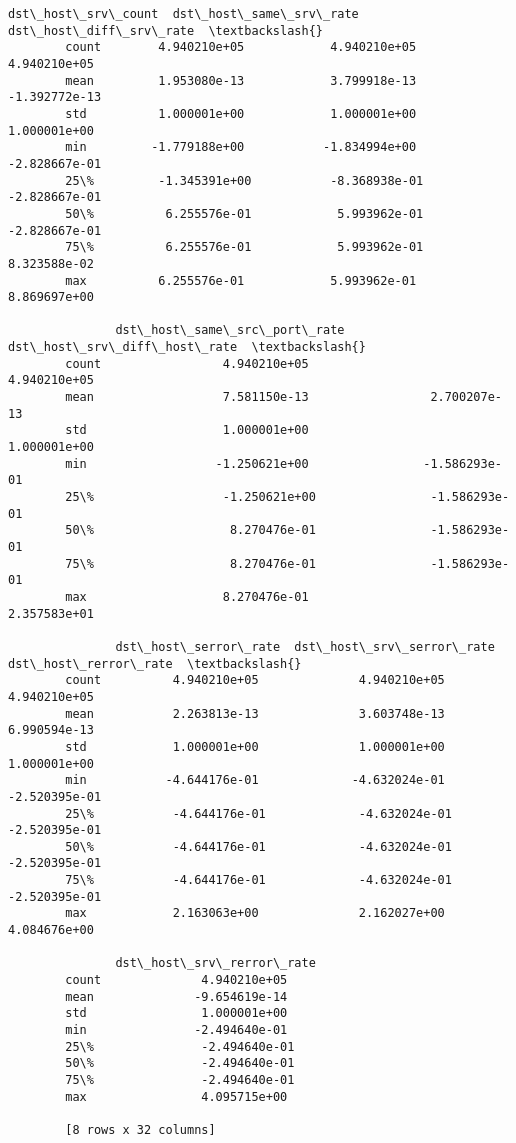 \documentclass[11pt]{article}
\begin{document}
\begin{Verbatim}[commandchars=\\\{\}]
               dst\_host\_srv\_count  dst\_host\_same\_srv\_rate  dst\_host\_diff\_srv\_rate  \textbackslash{}
        count        4.940210e+05            4.940210e+05            4.940210e+05   
        mean         1.953080e-13            3.799918e-13           -1.392772e-13   
        std          1.000001e+00            1.000001e+00            1.000001e+00   
        min         -1.779188e+00           -1.834994e+00           -2.828667e-01   
        25\%         -1.345391e+00           -8.368938e-01           -2.828667e-01   
        50\%          6.255576e-01            5.993962e-01           -2.828667e-01   
        75\%          6.255576e-01            5.993962e-01            8.323588e-02   
        max          6.255576e-01            5.993962e-01            8.869697e+00   
        
               dst\_host\_same\_src\_port\_rate  dst\_host\_srv\_diff\_host\_rate  \textbackslash{}
        count                 4.940210e+05                 4.940210e+05   
        mean                  7.581150e-13                 2.700207e-13   
        std                   1.000001e+00                 1.000001e+00   
        min                  -1.250621e+00                -1.586293e-01   
        25\%                  -1.250621e+00                -1.586293e-01   
        50\%                   8.270476e-01                -1.586293e-01   
        75\%                   8.270476e-01                -1.586293e-01   
        max                   8.270476e-01                 2.357583e+01   
        
               dst\_host\_serror\_rate  dst\_host\_srv\_serror\_rate  dst\_host\_rerror\_rate  \textbackslash{}
        count          4.940210e+05              4.940210e+05          4.940210e+05   
        mean           2.263813e-13              3.603748e-13          6.990594e-13   
        std            1.000001e+00              1.000001e+00          1.000001e+00   
        min           -4.644176e-01             -4.632024e-01         -2.520395e-01   
        25\%           -4.644176e-01             -4.632024e-01         -2.520395e-01   
        50\%           -4.644176e-01             -4.632024e-01         -2.520395e-01   
        75\%           -4.644176e-01             -4.632024e-01         -2.520395e-01   
        max            2.163063e+00              2.162027e+00          4.084676e+00   
        
               dst\_host\_srv\_rerror\_rate  
        count              4.940210e+05  
        mean              -9.654619e-14  
        std                1.000001e+00  
        min               -2.494640e-01  
        25\%               -2.494640e-01  
        50\%               -2.494640e-01  
        75\%               -2.494640e-01  
        max                4.095715e+00  
        
        [8 rows x 32 columns]
\end{Verbatim}
            
\end{document}
